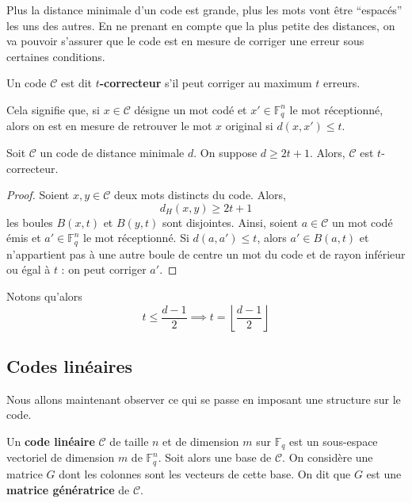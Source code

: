   Plus la distance minimale d'un code est grande, plus les mots vont être ``espacés'' les uns des autres. En ne prenant en compte que la plus petite des distances, on va pouvoir s'assurer que le code est en mesure de corriger une erreur sous certaines conditions.

  \begin{definition}
    Un code $\mathcal{C}$ est dit \textbf{$t$-correcteur} s'il peut corriger au maximum $t$ erreurs.
  \end{definition}

  \begin{remark}
    Cela signifie que, si $x \in \mathcal{C}$ désigne un mot codé et $x' \in \mathbb{F}_q^n$ le mot réceptionné, alors on est en mesure de retrouver le mot $x$ original si $d(x,x') \leq t$.
  \end{remark}

  \begin{proposition}
    Soit $\mathcal{C}$ un code de distance minimale $d$. On suppose $d \geq 2t + 1$. Alors, $\mathcal{C}$ est $t$-correcteur.
  \end{proposition}

  \begin{proof}
    Soient $x, y \in \mathcal{C}$ deux mots distincts du code. Alors,
    \[ d_H(x,y) \geq 2t+1 \]
    les boules $B(x,t)$ et $B(y,t)$ sont disjointes.
    Ainsi, soient $a \in \mathcal{C}$ un mot codé émis et $a' \in \mathbb{F}_q^n$ le mot réceptionné. Si $d(a,a') \leq t$, alors $a' \in B(a,t)$ et n'appartient pas à une autre boule de centre un mot du code et de rayon inférieur ou égal à $t$ : on peut corriger $a'$.
  \end{proof}

  \begin{remark}
    \label{codes-correcteurs-1}
    Notons qu'alors
    \[ t \leq \frac{d-1}{2} \implies t = \left\lfloor \frac{d-1}{2} \right\rfloor \]
  \end{remark}

  \subsection{Codes linéaires}

  Nous allons maintenant observer ce qui se passe en imposant une structure sur le code.

  \begin{definition}
    Un \textbf{code linéaire} $\mathcal{C}$ de taille $n$ et de dimension $m$ sur $\mathbb{F}_q$ est un sous-espace vectoriel de dimension $m$ de $\mathbb{F}_q^n$.
    \newpar
    Soit alors une base de $\mathcal{C}$. On considère une matrice $G$ dont les colonnes sont les vecteurs de cette base. On dit que $G$ est une \textbf{matrice génératrice} de $\mathcal{C}$.
  \end{definition}

